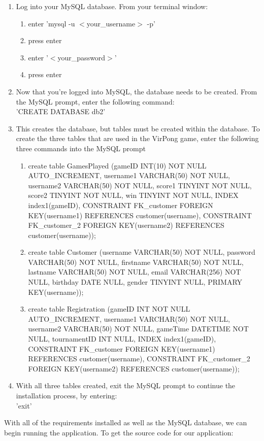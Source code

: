 		\begin{enumerate}
			\item Log into your MySQL database. From your terminal window:
			\begin{enumerate}
				\item enter 'mysql -u $<$your\_username$>$ -p'
				\item press enter
				\item enter '$<$your\_password$>$'
				\item press enter
			\end{enumerate}
			\item Now that you're logged into MySQL, the database needs to be created. From the MySQL prompt, enter the following command:\\'CREATE DATABASE db2'
			\item This creates the database, but tables must be created within the database. To create the three tables that are used in the VirPong game, enter the following three commands into the MySQL prompt
			\begin{enumerate}
				\item create table GamesPlayed (gameID INT(10) NOT NULL AUTO\_INCREMENT, username1 VARCHAR(50) NOT NULL, username2 VARCHAR(50) NOT NULL, score1 TINYINT NOT NULL, score2 TINYINT NOT NULL, win TINYINT NOT NULL, INDEX index1(gameID), CONSTRAINT FK\_customer FOREIGN KEY(username1) REFERENCES customer(username), CONSTRAINT FK\_customer\_2 FOREIGN KEY(username2) REFERENCES customer(username));
				\item create table Customer (username VARCHAR(50) NOT NULL, password VARCHAR(50) NOT NULL, firstname VARCHAR(50) NOT NULL, lastname VARCHAR(50) NOT NULL, email VARCHAR(256) NOT NULL, birthday DATE NULL, gender TINYINT NULL, PRIMARY KEY(username));
				\item create table Registration (gameID INT NOT NULL AUTO\_INCREMENT, username1 VARCHAR(50) NOT NULL, username2 VARCHAR(50) NOT NULL, gameTime DATETIME NOT NULL, tournamentID INT NULL,  INDEX index1(gameID), CONSTRAINT FK\_customer FOREIGN KEY(username1) REFERENCES customer(username), CONSTRAINT FK\_customer\_2 FOREIGN KEY(username2) REFERENCES customer(username));
			\end{enumerate}
			\item With all three tables created, exit the MySQL prompt to continue the installation process, by entering:\\'exit'
		\end{enumerate}
		With all of the requirements installed as well as the MySQL database, we can begin running the application. To get the source code for our application:
